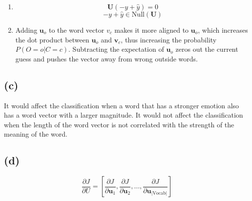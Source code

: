 \documentclass[11pt]{article}
\newcommand{\bvec}[1]{\textbf{#1}}
\begin{document}
\begin{enumerate}
\begin{align*}
{    }\\
    &= \frac{\bvec{u}_o^{\top}\exp(\bvec{u}_o^{\top}\bvec{v}_c)}{\sum_{w\in \text{Vocab}} \exp(\bvec{u}_w^{\top}\bvec{v}_c)} - \frac{ \exp(\bvec{u}_o^{\top}\bvec{v}_c) \sum_{w\in \text{Vocab}} \bvec{u}_w^{\top} \exp(\bvec{u}_w^{\top}\bvec{v}_c)}{\left(\sum_{w\in \text{Vocab}} \exp(\bvec{u}_w^{\top}\bvec{v}_c)\right)^2}\\
  \frac{\partial}{\partial \bvec{v}_c} \bvec{J}_{\text{naive-softmax}}(\bvec{v}_c, o, \bvec{U})
    &= -\bvec{u}_o^{\top} + \frac{\sum_{w\in \text{Vocab}} \bvec{u}_w^{\top} \exp(\bvec{u}_w^{\top}\bvec{v}_c)}{\sum_{w\in \text{Vocab}} \exp(\bvec{u}_w^{\top}\bvec{v}_c)}\\
    &= -\bvec{u}_o^{\top} + E_o[\bvec{u}_o^{\top}|C=c]
  \end{align*}
  With shape convention, \[ \frac{\partial}{\partial \bvec{v}_c} \bvec{J}_{\text{naive-softmax}}(\bvec{v}_c, o, \bvec{U}) = -\bvec{u}_o + E_o[\bvec{u}_o|C=c]   = -\bvec{U}y +\bvec{U}\hat{y} = \bvec{U}(-y+\hat{y}) \]

  \item 
  \[\bvec{U}(-y+\hat{y}) = 0 \]
  \[ -y+\hat{y}\in \text{Null}(\bvec{U}) \]
  
  \item Adding $\bvec{u}_o$ to the word vector $v_c$ makes it more aligned to $\bvec{u}_o$, which increases the dot product between $\bvec{u}_o$ and $\bvec{v}_c$, thus increasing the probability $P(O=o|C=c)$. Subtracting the expectation of $\bvec{u}_o$ zeros out the current guess and pushes the vector away from wrong outside words.
\end{enumerate}

\subsection*{(c)} It would affect the classification when a word that has a stronger emotion also has a word vector with a larger magnitude. It would not affect the classification when the length of the word vector is not correlated with the strength of the meaning of the word.

\subsection*{(d)}
$$\frac{\partial J}{\partial U} = \left[ \frac{\partial J}{\partial \bvec{u}_1}, \frac{\partial J}{\partial \bvec{u}_2}, \dots, \frac{\partial J}{\partial \bvec{u}_{|\text{Vocab}|}} \right]$$
\end{document}

